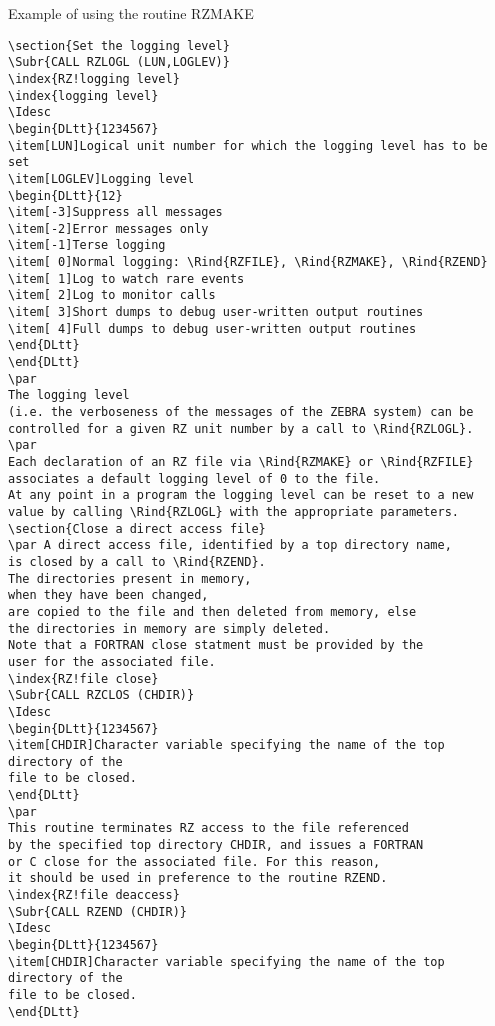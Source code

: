 \begin{XMPt}{Example of using the routine RZMAKE}
\begin{verbatim}
\section{Set the logging level}
\Subr{CALL RZLOGL (LUN,LOGLEV)}
\index{RZ!logging level}
\index{logging level}
\Idesc
\begin{DLtt}{1234567}
\item[LUN]Logical unit number for which the logging level has to be set
\item[LOGLEV]Logging level
\begin{DLtt}{12}
\item[-3]Suppress all messages
\item[-2]Error messages only
\item[-1]Terse logging
\item[ 0]Normal logging: \Rind{RZFILE}, \Rind{RZMAKE}, \Rind{RZEND}
\item[ 1]Log to watch rare events
\item[ 2]Log to monitor calls
\item[ 3]Short dumps to debug user-written output routines
\item[ 4]Full dumps to debug user-written output routines
\end{DLtt}
\end{DLtt}
\par 
The logging level
(i.e. the verboseness of the messages of the ZEBRA system) can be
controlled for a given RZ unit number by a call to \Rind{RZLOGL}.
\par 
Each declaration of an RZ file via \Rind{RZMAKE} or \Rind{RZFILE}
associates a default logging level of 0 to the file.
At any point in a program the logging level can be reset to a new
value by calling \Rind{RZLOGL} with the appropriate parameters.
\section{Close a direct access file}
\par A direct access file, identified by a top directory name,
is closed by a call to \Rind{RZEND}.
The directories present in memory,
when they have been changed,
are copied to the file and then deleted from memory, else
the directories in memory are simply deleted.
Note that a FORTRAN close statment must be provided by the
user for the associated file.
\index{RZ!file close}
\Subr{CALL RZCLOS (CHDIR)}
\Idesc
\begin{DLtt}{1234567}
\item[CHDIR]Character variable specifying the name of the top directory of the
file to be closed.
\end{DLtt}
\par
This routine terminates RZ access to the file referenced
by the specified top directory CHDIR, and issues a FORTRAN
or C close for the associated file. For this reason,
it should be used in preference to the routine RZEND.
\index{RZ!file deaccess}
\Subr{CALL RZEND (CHDIR)}
\Idesc
\begin{DLtt}{1234567}
\item[CHDIR]Character variable specifying the name of the top directory of the
file to be closed.
\end{DLtt}

\end{verbatim}
\end{XMPt}
